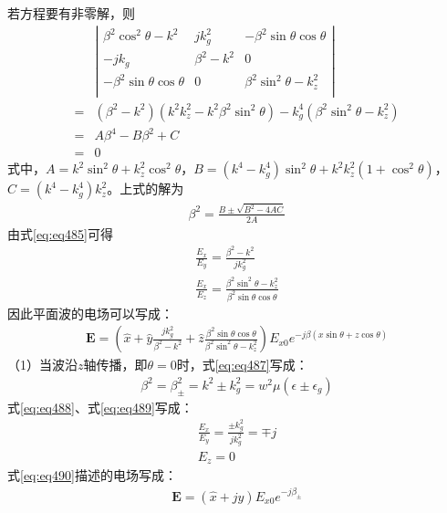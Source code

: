 \documentclass{article}
\numberwithin{equation}{section}
\begin{document}
若方程要有非零解，则
\begin{align}
    \label{eq:eq486}
    &\left|
        \begin{matrix}
            \beta^2\cos^2\theta-k^2 & jk^2_g & -\beta^2\sin\theta\cos\theta \\
            -jk_g & \beta^2-k^2 & 0 \\
            -\beta^2\sin\theta\cos\theta & 0 & \beta^2\sin^2\theta-k_z^2 \\
        \end{matrix}
    \right| \\
    =&(\beta^2-k^2)(k^2k_z^2-k^2\beta^2\sin^2\theta)-k_g^4(\beta^2\sin^2\theta-k_z^2) \\
    =&A\beta^4-B\beta^2+C \\
    =&0
\end{align}
式中，$A=k^2\sin^2\theta+k_z^2\cos^2\theta$，$B=(k^4-k_g^4)\sin^2\theta+k^2k_z^2(1+\cos^2\theta)$，$C=(k^4-k_g^4)k_z^2$。上式的解为
\begin{align}
    \label{eq:eq487}
    \beta^2=\frac{B\pm\sqrt{B^2-4AC}}{2A}
\end{align}
由式\ref{eq:eq485}可得
\begin{align}
    \label{eq:eq488}
    \frac{E_x}{E_y}=\frac{\beta^2-k^2}{jk^2_g} \\
    \label{eq:eq489}
    \frac{E_x}{E_z}=\frac{\beta^2\sin^2\theta-k_z^2}{\beta^2\sin\theta\cos\theta}
\end{align}
因此平面波的电场可以写成：
\begin{align}
    \label{eq:eq490}
    \mathbf{E}=\left(\hat{x}+\hat{y}\frac{jk^2_g}{\beta^2-k^2}+\hat{z}\frac{\beta^2\sin\theta\cos\theta}{\beta^2\sin^2\theta-k_z^2}\right)E_{x0}e^{-j\beta(x\sin\theta+z\cos\theta)}
\end{align}
（1）当波沿$z$轴传播，即$\theta=0$时，式\ref{eq:eq487}写成：
\begin{align}
    \label{eq:eq491}
    \beta^2=\beta_{\pm}^2=k^2\pm k_g^2=w^2\mu(\epsilon\pm\epsilon_g)
\end{align}
式\ref{eq:eq488}、式\ref{eq:eq489}写成：
\begin{align}
    \label{eq:eq492}
    \frac{E_x}{E_y}=\frac{\pm k^2_g}{jk^2_g}=\mp j \\
    \label{eq:eq493}
    E_z=0
\end{align}
式\ref{eq:eq490}描述的电场写成：
\begin{align}
    \label{eq:eq494}
    \mathbf{E}=\left(\hat{x}+j\hat{y}\right)E_{x0}e^{-j\beta_{\pm}}
\end{align}
\end{document}
